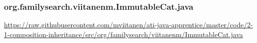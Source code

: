 \vspace{1em}
\subsubsection*{org.familysearch.viitanenm.ImmutableCat.java}
\noindent
\begin{minipage}{.6in}
\end{minipage}
\begin{minipage}{6in}
  \url{https://raw.githubusercontent.com/mviitanen/ati-java-apprentice/master/code/2-1-composition-inheritance/src/org/familysearch/viitanenm/ImmutableCat.java}
\end{minipage}